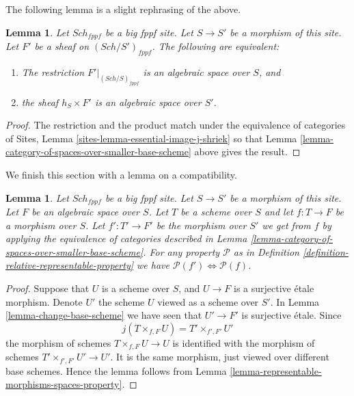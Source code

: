 \documentclass{stacks-project}
\theoremstyle{plain}
\newtheorem{lemma}[subsection]{Lemma}
\theoremstyle{definition}
\theoremstyle{remark}
\numberwithin{equation}{subsection}
\def\Sch{\mathit{Sch}}
\begin{document}
\noindent
The following lemma is a slight rephrasing of the above.

\begin{lemma}
\label{lemma-rephrase}
Let $\Sch_{fppf}$ be a big fppf site.
Let $S \to S'$ be a morphism of this site.
Let $F'$ be a sheaf on $(\Sch/S')_{fppf}$.
The following are equivalent:
\begin{enumerate}
\item The restriction $F'|_{(\Sch/S)_{fppf}}$
is an algebraic space over $S$, and
\item the sheaf $h_S \times F'$ is an algebraic space over $S'$.
\end{enumerate}
\end{lemma}

\begin{proof}
The restriction and the product match under
the equivalence of categories of
Sites, Lemma \ref{sites-lemma-essential-image-j-shriek}
so that
Lemma \ref{lemma-category-of-spaces-over-smaller-base-scheme}
above gives the result.
\end{proof}

\noindent
We finish this section with a lemma on a compatibility.

\begin{lemma}
\label{lemma-viewed-as-properties}
Let $\Sch_{fppf}$ be a big fppf site.
Let $S \to S'$ be a morphism of this site.
Let $F$ be an algebraic space over $S$.
Let $T$ be a scheme over $S$ and let $f : T \to F$ be
a morphism over $S$.
Let $f' : T' \to F'$ be the morphism over $S'$ we get from
$f$ by applying the equivalence of categories described in
Lemma \ref{lemma-category-of-spaces-over-smaller-base-scheme}.
For any property $\mathcal{P}$ as in
Definition \ref{definition-relative-representable-property}
we have $\mathcal{P}(f') \Leftrightarrow \mathcal{P}(f)$.
\end{lemma}

\begin{proof}
Suppose that $U$ is a scheme over $S$, and $U \to F$ is a surjective \'etale
morphism. Denote $U'$ the scheme $U$ viewed as a scheme over $S'$. In
Lemma \ref{lemma-change-base-scheme}
we have seen that $U' \to F'$ is surjective \'etale. Since
$$
j(T \times_{f, F} U) = T' \times_{f', F'} U'
$$
the morphism of schemes $T \times_{f, F} U \to U$
is identified with the morphism of schemes
$T' \times_{f', F'} U' \to U'$.
It is the same morphism, just viewed over different base schemes.
Hence the lemma follows from
Lemma \ref{lemma-representable-morphisms-spaces-property}.
\end{proof}














\end{document}
